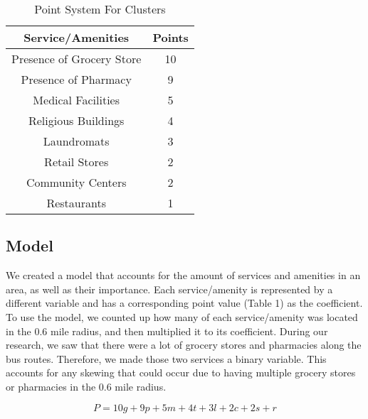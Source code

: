 \begin{table}[ht]
    \centering
    \begin{tabular}{c|c}
        \textbf{Service/Amenities} & \textbf{Points} \\
        \hline
        Presence of Grocery Store & 10\\
        Presence of Pharmacy & 9\\
        Medical Facilities & 5\\
        Religious Buildings & 4\\
        Laundromats & 3\\
        Retail Stores & 2\\
        Community Centers & 2\\
        Restaurants & 1\\
        
    \end{tabular}
    \caption{Point System For Clusters}
    \label{tab:my_label}
\end{table}


\subsection{Model}
We created a model that accounts for the amount of services and amenities in an area, as well as their importance.  Each service/amenity is represented by a different variable and has a corresponding point value (Table 1) as the coefficient.  To use the model, we counted up how many of each service/amenity was located in the 0.6 mile radius, and then multiplied it to its coefficient.  During our research, we saw that there were a lot of grocery stores and pharmacies along the bus routes.  Therefore, we made those two services a binary variable.  This accounts for any skewing that could occur due to having multiple grocery stores or pharmacies in the 0.6 mile radius.


\begin{equation}
    P=10g+9p+5m+4t+3l+2c+2s+r
\end{equation}
